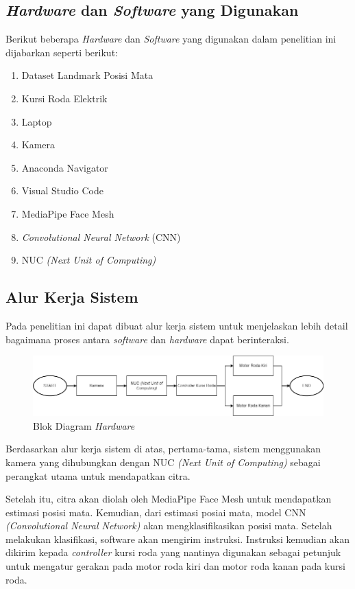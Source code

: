 \subsection{\emph{Hardware} dan \emph{Software} yang Digunakan}
\label{sec:hardware dan software}

Berikut beberapa \emph{Hardware} dan \emph{Software} yang digunakan dalam penelitian ini dijabarkan seperti berikut:
\begin{enumerate}
    \item Dataset Landmark Posisi Mata
    \item Kursi Roda Elektrik
    \item Laptop 
    \item Kamera
    \item Anaconda Navigator
    \item Visual Studio Code
    \item MediaPipe Face Mesh
    \item \textit{Convolutional Neural Network} (CNN)
    \item NUC \textit{(Next Unit of Computing)}

\end{enumerate}

\subsection{Alur Kerja Sistem}
\label{sec:alur kerja}

Pada penelitian ini dapat dibuat alur kerja sistem untuk menjelaskan lebih detail bagaimana proses antara \textit{software} dan \textit{hardware} dapat berinteraksi. 

\begin{figure} [ht] \centering
  \includegraphics[scale=0.5]{gambar/bab3/hardware.png}
  \caption{Blok Diagram \textit{Hardware}}
  \label{fig:hardware}
\end{figure}

Berdasarkan alur kerja sistem di atas, pertama-tama, sistem menggunakan kamera yang dihubungkan dengan NUC \textit{(Next Unit of Computing)} sebagai perangkat utama untuk mendapatkan citra.

Setelah itu, citra akan diolah oleh MediaPipe Face Mesh untuk mendapatkan estimasi posisi mata. Kemudian, dari estimasi posiai mata, model CNN \textit{(Convolutional Neural Network)} akan mengklasifikasikan posisi mata. Setelah melakukan klasifikasi, software akan mengirim instruksi. Instruksi kemudian akan dikirim kepada \textit{controller} kursi roda yang nantinya digunakan sebagai petunjuk untuk mengatur gerakan pada motor roda kiri dan motor roda kanan pada kursi roda.